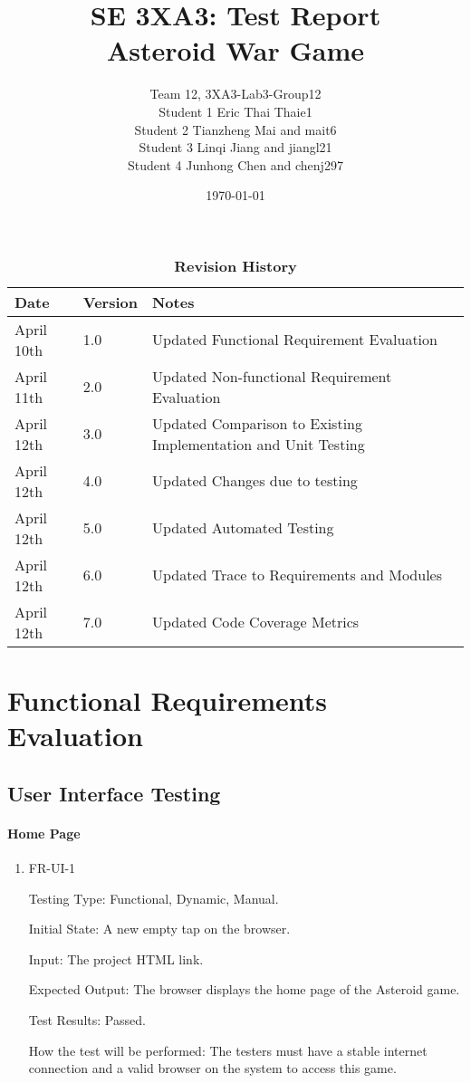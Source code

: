 \documentclass[12pt, titlepage]{article}
\title{SE 3XA3: Test Report\\Asteroid War Game}
\author{Team 12, 3XA3-Lab3-Group12
		\\ Student 1 Eric Thai Thaie1
		\\ Student 2 Tianzheng Mai and mait6
		\\ Student 3 Linqi Jiang and jiangl21
		\\ Student 4 Junhong Chen and chenj297
}
\date{\today}
\begin{document}
\maketitle

\tableofcontents
\listoftables
\begin{table}[H]
\caption{\bf Revision History}
\begin{tabularx}{\textwidth}{p{3cm}p{2cm}X}
\toprule {\bf Date} & {\bf Version} & {\bf Notes}\\
\midrule
April 10th & 1.0 & Updated Functional Requirement Evaluation\\
April 11th & 2.0 & Updated Non-functional Requirement Evaluation\\
April 12th & 3.0 & Updated Comparison to Existing Implementation and Unit Testing\\
April 12th & 4.0 & Updated Changes due to testing\\
April 12th & 5.0 & Updated Automated Testing\\
April 12th & 6.0 & Updated Trace to Requirements and Modules\\
April 12th & 7.0 & Updated Code Coverage Metrics\\
\bottomrule
\end{tabularx}
\end{table}


\newpage



\section{Functional Requirements Evaluation}
\subsection{User Interface Testing}
		
\paragraph{Home Page}

\begin{enumerate}

\item{FR-UI-1\\}

Testing Type: Functional, Dynamic, Manual. 
 
Initial State: A new empty tap on the browser.

Input: The project HTML link.

Expected Output: The browser displays the home page of the Asteroid game.

Test Results: Passed.

How the test will be performed: The testers must have a stable internet connection and a valid browser on the system to access this game.
\\
\end{enumerate}
\end{document}
